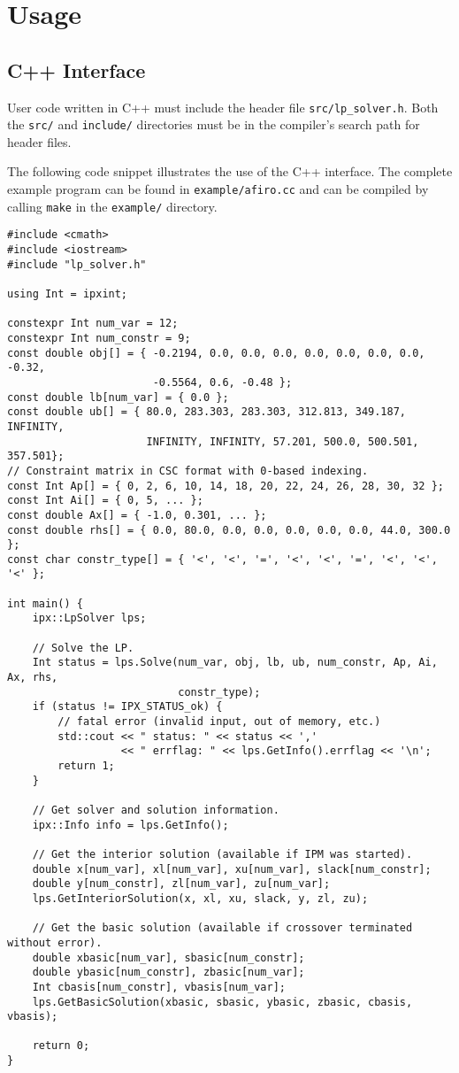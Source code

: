 \documentclass{article}
\newcommand{\ct}{\texttt}
\begin{document}
\section{Usage}

\subsection{C++ Interface}
User code written in C++ must include the header file \ct{src/lp\_solver.h}.
Both the \ct{src/} and \ct{include/} directories must be in the compiler's
search path for header files.

The following code snippet illustrates the use of the C++ interface. The
complete example program can be found in \ct{example/afiro.cc} and can be
compiled by calling \ct{make} in the \ct{example/} directory.

\newpage
\begin{verbatim}
#include <cmath>
#include <iostream>
#include "lp_solver.h"

using Int = ipxint;

constexpr Int num_var = 12;
constexpr Int num_constr = 9;
const double obj[] = { -0.2194, 0.0, 0.0, 0.0, 0.0, 0.0, 0.0, 0.0, -0.32,
                       -0.5564, 0.6, -0.48 };
const double lb[num_var] = { 0.0 };
const double ub[] = { 80.0, 283.303, 283.303, 312.813, 349.187, INFINITY,
                      INFINITY, INFINITY, 57.201, 500.0, 500.501, 357.501};
// Constraint matrix in CSC format with 0-based indexing.
const Int Ap[] = { 0, 2, 6, 10, 14, 18, 20, 22, 24, 26, 28, 30, 32 };
const Int Ai[] = { 0, 5, ... };
const double Ax[] = { -1.0, 0.301, ... };
const double rhs[] = { 0.0, 80.0, 0.0, 0.0, 0.0, 0.0, 0.0, 44.0, 300.0 };
const char constr_type[] = { '<', '<', '=', '<', '<', '=', '<', '<', '<' };

int main() {
    ipx::LpSolver lps;

    // Solve the LP.
    Int status = lps.Solve(num_var, obj, lb, ub, num_constr, Ap, Ai, Ax, rhs,
                           constr_type);
    if (status != IPX_STATUS_ok) {
        // fatal error (invalid input, out of memory, etc.)
        std::cout << " status: " << status << ','
                  << " errflag: " << lps.GetInfo().errflag << '\n';
        return 1;
    }

    // Get solver and solution information.
    ipx::Info info = lps.GetInfo();

    // Get the interior solution (available if IPM was started).
    double x[num_var], xl[num_var], xu[num_var], slack[num_constr];
    double y[num_constr], zl[num_var], zu[num_var];
    lps.GetInteriorSolution(x, xl, xu, slack, y, zl, zu);

    // Get the basic solution (available if crossover terminated without error).
    double xbasic[num_var], sbasic[num_constr];
    double ybasic[num_constr], zbasic[num_var];
    Int cbasis[num_constr], vbasis[num_var];
    lps.GetBasicSolution(xbasic, sbasic, ybasic, zbasic, cbasis, vbasis);

    return 0;
}
\end{verbatim}
\end{document}
